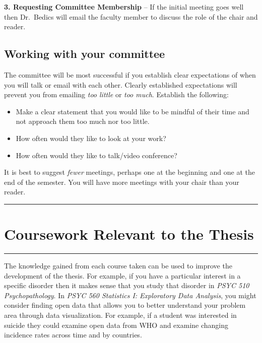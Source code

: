 \documentclass[openany]{book}
\begin{document}
\textbf{3. Requesting Committee Membership} -- If the initial meeting goes well then Dr.~Bedics will email the faculty member to discuss the role of the chair and reader.

\hypertarget{working-with-your-committee}{%
\section{Working with your committee}\label{working-with-your-committee}}

The committee will be most successful if you establish clear expectations of when you will talk or email with each other. Clearly established expectations will prevent you from emailing \emph{too little} or \emph{too much}. Establish the following:

\begin{itemize}
\item
  Make a clear statement that you would like to be mindful of their time and not approach them too much nor too little.
\item
  How often would they like to look at your work?
\item
  How often would they like to talk/video conference?
\end{itemize}

It is best to suggest \emph{fewer} meetings, perhaps one at the beginning and one at the end of the semester. You will have more meetings with your chair than your reader.

\begin{center}\rule{0.5\linewidth}{0.5pt}\end{center}

\hypertarget{coursework-relevant-to-the-thesis}{%
\chapter{Coursework Relevant to the Thesis}\label{coursework-relevant-to-the-thesis}}

\begin{center}\rule{0.5\linewidth}{0.5pt}\end{center}

The knowledge gained from each course taken can be used to improve the development of the thesis. For example, if you have a particular interest in a specific disorder then it makes sense that you study that disorder in \emph{PSYC 510 Psychopathology}. In \emph{PSYC 560 Statistics I: Exploratory Data Analysis}, you might consider finding open data that allows you to better understand your problem area through data visualization. For example, if a student was interested in suicide they could examine open data from WHO and examine changing incidence rates across time and by countries.
\end{document}
